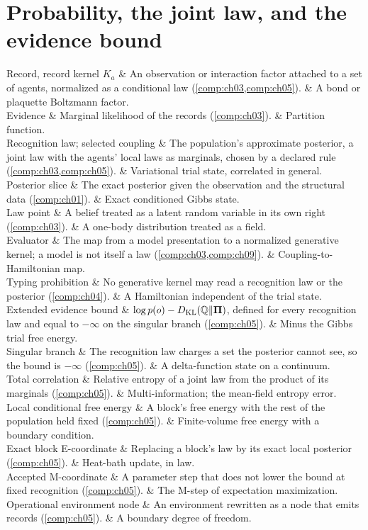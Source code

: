 \section*{Probability, the joint law, and the evidence bound}

\begin{decoder}
Record, record kernel $K_a$ & An observation or interaction factor attached to a set of agents, normalized as a conditional law (\cref{comp:ch03,comp:ch05}). & A bond or plaquette Boltzmann factor. \\
Evidence & Marginal likelihood of the records (\cref{comp:ch03}). & Partition function. \\
Recognition law; selected coupling & The population's approximate posterior, a joint law with the agents' local laws as marginals, chosen by a declared rule (\cref{comp:ch03,comp:ch05}). & Variational trial state, correlated in general. \\
Posterior slice & The exact posterior given the observation and the structural data (\cref{comp:ch01}). & Exact conditioned Gibbs state. \\
Law point & A belief treated as a latent random variable in its own right (\cref{comp:ch03}). & A one-body distribution treated as a field. \\
Evaluator & The map from a model presentation to a normalized generative kernel; a model is not itself a law (\cref{comp:ch03,comp:ch09}). & Coupling-to-Hamiltonian map. \\
Typing prohibition & No generative kernel may read a recognition law or the posterior (\cref{comp:ch04}). & A Hamiltonian independent of the trial state. \\
Extended evidence bound & $\log p(o)-D_{\mathrm{KL}}(\mathbb Q\Vert\boldsymbol\Pi)$, defined for every recognition law and equal to $-\infty$ on the singular branch (\cref{comp:ch05}). & Minus the Gibbs trial free energy. \\
Singular branch & The recognition law charges a set the posterior cannot see, so the bound is $-\infty$ (\cref{comp:ch05}). & A delta-function state on a continuum. \\
Total correlation & Relative entropy of a joint law from the product of its marginals (\cref{comp:ch05}). & Multi-information; the mean-field entropy error. \\
Local conditional free energy & A block's free energy with the rest of the population held fixed (\cref{comp:ch05}). & Finite-volume free energy with a boundary condition. \\
Exact block E-coordinate & Replacing a block's law by its exact local posterior (\cref{comp:ch05}). & Heat-bath update, in law. \\
Accepted M-coordinate & A parameter step that does not lower the bound at fixed recognition (\cref{comp:ch05}). & The M-step of expectation maximization. \\
Operational environment node & An environment rewritten as a node that emits records (\cref{comp:ch05}). & A boundary degree of freedom. \\
\end{decoder}

